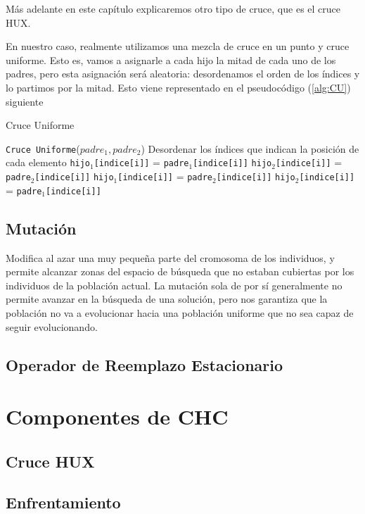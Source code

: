 Más adelante en este capítulo explicaremos otro tipo de cruce, que es el cruce HUX. 

En nuestro caso, realmente utilizamos una mezcla de cruce en un punto y cruce uniforme. 
Esto es, vamos a asignarle a cada hijo la mitad de cada uno de los padres, pero esta asignación será aleatoria: desordenamos el orden de los índices y lo partimos por la mitad. 
Esto viene representado en el pseudocódigo (\ref{alg:CU}) siguiente

\begin{algorithm}[H]
\caption{Cruce Uniforme}\label{alg:CU}
\begin{algorithmic}[1]
\Procedure \texttt{Cruce Uniforme}($padre_1, padre_2$)
\State Desordenar los índices que indican la posición de cada elemento
		\State \texttt{hijo$_1$[indice[i]]} = \texttt{padre$_1$[indice[i]]}
		\State \texttt{hijo$_2$[indice[i]]} = \texttt{padre$_2$[indice[i]]}
	\Else
		\State \texttt{hijo$_1$[indice[i]]} = \texttt{padre$_2$[indice[i]]}
		\State \texttt{hijo$_2$[indice[i]]} = \texttt{padre$_1$[indice[i]]}
	\EndIf
\EndFor
\EndProcedure
\end{algorithmic}
\end{algorithm}

\subsection{Mutación}

Modifica al azar una muy pequeña parte del cromosoma de los individuos, y permite alcanzar zonas del espacio de búsqueda que no estaban cubiertas por los individuos de la población actual. 
La mutación sola de por sí generalmente no permite avanzar en la búsqueda de una solución, pero nos garantiza que la población no va a evolucionar hacia una población uniforme que no sea capaz de seguir evolucionando. 




\subsection{Operador de Reemplazo Estacionario}

\section{Componentes de CHC}

\subsection{Cruce HUX}

\subsection{Enfrentamiento}